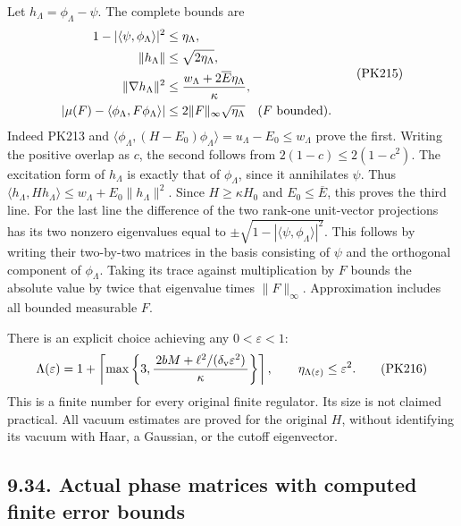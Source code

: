 \documentclass[11pt]{article}
\begin{document}
Let \(h_\Lambda=\phi_\Lambda-\psi\). The complete bounds are
\[
 \begin{split}
 1-|\langle\psi,\phi_\Lambda\rangle|^2&\le\eta_\Lambda,\\
 \|h_\Lambda\|&\le\sqrt{2\eta_\Lambda},\\
 \|\nabla h_\Lambda\|^2
   &\le\frac{w_\Lambda+2\overline E\eta_\Lambda}{\kappa},\\
 \left|\mu(F)-\langle\phi_\Lambda,F\phi_\Lambda\rangle\right|
   &\le2\|F\|_\infty\sqrt{\eta_\Lambda}
                    \quad(F\hbox{ bounded}).
 \end{split}\tag{PK215}
\]
Indeed PK213 and
\(\langle\phi_\Lambda,(H-E_0)\phi_\Lambda\rangle
=u_\Lambda-E_0\le w_\Lambda\) prove the first.
Writing the positive overlap as \(c\), the second follows from
\(2(1-c)\le2(1-c^2)\).
The excitation form of \(h_\Lambda\) is exactly that of
\(\phi_\Lambda\), since it annihilates \(\psi\). Thus
\(\langle h_\Lambda,Hh_\Lambda\rangle
\le w_\Lambda+E_0\|h_\Lambda\|^2\).
Since \(H\ge\kappa H_0\) and \(E_0\le\overline E\), this proves
the third line. For the last line the difference of the two
rank-one unit-vector projections has its two nonzero
eigenvalues equal to
\(\pm\sqrt{1-|\langle\psi,\phi_\Lambda\rangle|^2}\).
This follows by writing their two-by-two matrices in the basis
consisting of \(\psi\) and the orthogonal component of
\(\phi_\Lambda\). Taking its trace against multiplication by
\(F\) bounds the absolute value by twice that eigenvalue
times \(\|F\|_\infty\). Approximation includes all bounded
measurable \(F\).

There is an explicit choice achieving any \(0<\varepsilon<1\):
\[
 \Lambda(\varepsilon)
 =1+\left\lceil\max\left\{
 3,\frac{\,2bM+\ell^2/(\delta_{\rm v}\varepsilon^2)\,}
                {\kappa}\right\}\right\rceil ,
 \qquad \eta_{\Lambda(\varepsilon)}\le\varepsilon^2 .
 \tag{PK216}
\]
This is a finite number for every original finite regulator.
Its size is not claimed practical. All vacuum estimates are
proved for the original \(H\), without identifying its vacuum
with Haar, a Gaussian, or the cutoff eigenvector.

\subsection*{9.34. Actual phase matrices with computed finite error bounds}
\end{document}
